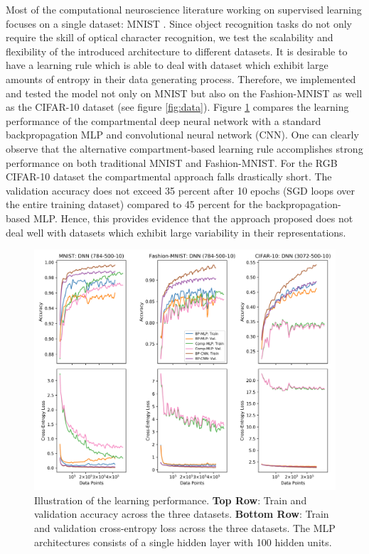 \documentclass[colorinlistoftodos]{article}
\theoremstyle{definition}
\begin{document}
Most of the computational neuroscience literature working on supervised learning focuses on a single dataset: MNIST \cite{lecun_1998}. Since object recognition tasks do not only require the skill of optical character recognition, we test the scalability and flexibility of the introduced architecture to different datasets. It is desirable to have a learning rule which is able to deal with dataset which exhibit large amounts of entropy in their data generating process. Therefore, we implemented and tested the \citet{guerguiev2017} model not only on MNIST but also on the Fashion-MNIST \citep{xiao_2017} as well as the CIFAR-10 \citep{torralba_2008} dataset (see figure \ref{fig:data}). Figure \ref{fig:performance} compares the learning performance of the compartmental deep neural network with a standard backpropagation MLP and convolutional neural network (CNN). One can clearly observe that the alternative compartment-based learning rule accomplishes strong performance on both traditional MNIST and Fashion-MNIST. For the RGB CIFAR-10 dataset the compartmental approach falls drastically short. The validation accuracy does not exceed 35 percent after 10 epochs (SGD loops over the entire training dataset) compared to 45 percent for the backpropagation-based MLP.
Hence, this provides evidence that the approach proposed does not deal well with datasets which exhibit large variability in their representations.

\begin{figure}[H]
	\centering
	\includegraphics[width=\textwidth]{../figures/learning}
	\caption{Illustration of the learning performance. \textbf{Top Row}: Train and validation accuracy across the three datasets. \textbf{Bottom Row}: Train and validation cross-entropy loss across the three datasets. The MLP architectures consists of a single hidden layer with 100 hidden units.} \label{fig:performance}
\end{figure}
\end{document}
